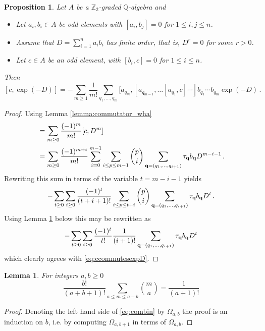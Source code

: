 \documentclass[english,letter paper,12pt,leqno]{article}
\newtheorem{proposition}[theorem]{Proposition}
\newtheorem{lemma}[theorem]{Lemma}
\theoremstyle{example}
\numberwithin{equation}{section}
\def\be{\begin{equation}}
\def\ee{\end{equation}}
\def\nZ{\mathds{Z}}
\def\nQ{\mathds{Q}}
\begin{document}
\begin{proposition}\label{prop:ccommutesexpD} Let $A$ be a $\nZ_2$-graded $\nQ$-algebra and
\begin{itemize}
\item Let $a_i, b_i \in A$ be odd elements with $[a_i,b_j] = 0$ for $1 \le i,j \le n$.
\item Assume that $D = \sum_{i=1}^n a_i b_i$ has finite order, that is, $D^r = 0$ for some $r > 0$.
\item Let $c \in A$ be an odd element, with $[b_i, c] = 0$ for $1 \le i \le n$.
\end{itemize}
Then
\be\label{eq:ccommutesexpD}
[c, \exp(-D)] = - \sum_{m \ge 1} \frac{1}{m!} \sum_{q_1,\ldots,q_m} [ a_{q_m}, [ a_{q_{m-1}}, \ldots [ a_{q_1}, c ] \cdots ] b_{q_1} \cdots b_{q_m} \exp(-D)\,.
\ee
\end{proposition}
\begin{proof}
Using Lemma \ref{lemma:commutator_wha}
\begin{align*}
[c, \exp(-D)] &= \sum_{m \ge 0} \frac{(-1)^m}{m!} [c, D^m]\\
&= \sum_{m \ge 0} \frac{(-1)^{m+i}}{m!} \sum_{i=0}^{m-1} \sum_{i \le p \le m -1} \binom{p}{i} \sum_{\bold{q} = (q_1,\ldots,q_{i+1})} \tau_{\bold{q}} b_{\bold{q}} D^{m-i-1}\,.
\end{align*}
Rewriting this sum in terms of the variable $t = m - i - 1$ yields
\[
- \sum_{t \ge 0} \sum_{i \ge 0} \frac{(-1)^{t}}{(t+i+1)!} \sum_{i \le p \le t+i}  \binom{p}{i} \sum_{\bold{q} = (q_1,\ldots,q_{i+1})} \tau_{\bold{q}} b_{\bold{q}} D^{t}\,.
\]
Using Lemma \ref{lemma:combin} below this may be rewritten as
\[
- \sum_{t \ge 0} \sum_{i \ge 0} \frac{(-1)^t}{t!} \frac{1}{(i+1)!} \sum_{\bold{q} = (q_1,\ldots,q_{i+1})} \tau_{\bold{q}} b_{\bold{q}} D^{t}
\]
which clearly agrees with \eqref{eq:ccommutesexpD}.
\end{proof}

\begin{lemma}\label{lemma:combin} For integers $a, b \ge 0$
\begin{equation}\label{eq:combin}
\frac{b!}{(a+b+1)!} \sum_{a \le m \le a + b} \binom{m}{a} = \frac{1}{(a+1)!}
\end{equation}
\end{lemma}
\begin{proof}
Denoting the left hand side of \eqref{eq:combin} by $\Omega_{a,b}$ the proof is an induction on $b$, i.e. by computing $\Omega_{a,b+1}$ in terms of $\Omega_{a,b}$.
\end{proof}
\end{document}
